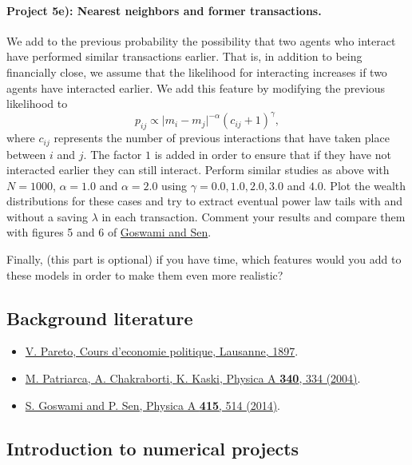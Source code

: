 \documentclass[%
oneside,                 %
final,                   %
10pt]{article}
\begin{document}
\paragraph{Project 5e): Nearest neighbors and former  transactions.}
We add to the previous probability the possibility that two agents who interact have performed similar transactions earlier. That is, in addition to being financially close, we assume that the likelihood for interacting increases if two agents have interacted earlier. 
We add this feature by modifying the previous likelihood to
\[
p_{ij} \propto \vert m_i-m_j\vert^{-\alpha}\left(c_{ij}+1\right)^{\gamma},
\]
where $c_{ij}$ represents the number of  previous interactions that have taken place between $i$ and $j$. The factor $1$ is added in order to ensure that if they have not interacted earlier they can still interact.  Perform similar studies as above with $N=1000$, $\alpha=1.0$ and $\alpha=2.0$ using $\gamma = 0.0, 1.0, 2.0, 3.0$ and $4.0$. Plot the wealth distributions for these cases and try to extract eventual power law tails with and without a saving $\lambda$ in each transaction. Comment your results and compare them with figures 5 and 6 of \href{{http://www.sciencedirect.com/science/article/pii/S0378437114006967}}{Goswami and Sen}.  

Finally, (this part is optional) if you have time, which features would you add to these models in order to make them even more realistic? 

\subsection*{Background literature}

\begin{itemize}
  \item \href{{http://www.institutcoppet.org/2012/05/08/cours-deconomie-politique-1896-de-vilfredo-pareto}}{V. Pareto, Cours d'economie politique, Lausanne, 1897}.

  \item \href{{http://www.sciencedirect.com/science/article/pii/S0378437104004327}}{M. Patriarca, A. Chakraborti, K. Kaski, Physica A \textbf{340}, 334 (2004)}.

  \item \href{{http://www.sciencedirect.com/science/article/pii/S0378437114006967}}{S. Goswami and P. Sen, Physica A \textbf{415}, 514 (2014)}.
\end{itemize}

\noindent
\subsection*{Introduction to numerical projects}
\end{document}
